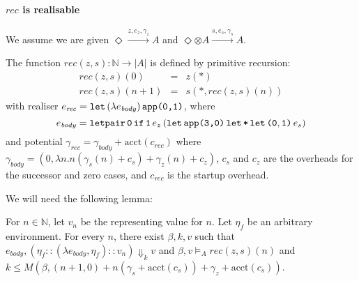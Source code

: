 \documentclass{workingnote}
\newcommand{\account}{\mathrm{acct}}
\begin{document}
\paragraph{$\mathit{rec}$ is realisable} We assume we are given
$\Diamond \stackrel{z,e_z,\gamma_z}\longrightarrow A$ and
$\Diamond \otimes A \stackrel{s,e_s,\gamma_s}\longrightarrow A$.

The function $\mathit{rec}(z,s) : \mathbb{N} \to |A|$ is defined by
primitive recursion:
\begin{displaymath}
  \begin{array}{lcl}
    \mathit{rec}(z,s)(0)&=&z(*) \\
    \mathit{rec}(z,s)(n+1)&=&s(*,\mathit{rec}(z,s)(n))
  \end{array}
\end{displaymath}
with realiser
$e_{\mathit{rec}} = \texttt{let}\,(\lambda e_{\mathit{body}})\,\texttt{app(}\texttt{0}\texttt{,}\texttt{1}\texttt{)}$, where
\begin{displaymath}
  e_{\mathit{body}} = \texttt{letpair}\,\texttt{0}\,\texttt{if}\,\texttt{1}\,e_z\,(\texttt{let}\,\texttt{app(}\texttt{3}\texttt{,}\texttt{0}\texttt{)}\,\texttt{let}\,\texttt{*}\,\texttt{let}\,\texttt{(}\texttt{0},\texttt{1}\texttt{)}\,e_s)
\end{displaymath}
and potential
$\gamma_{\mathit{rec}} = \gamma_{\mathit{body}} +
\account(c_{\mathit{rec}})$ where
$\gamma_{\mathit{body}} = (0, \lambda n. n(\gamma_s(n) + c_s)+
\gamma_z(n) + c_z)$, $c_s$ and $c_z$ are the overheads for the
successor and zero cases, and $c_{\mathit{rec}}$ is the startup
overhead.

We will need the following lemma:
\begin{lemma}\label{lem:natrec-lemma}
  For $n \in \mathbb{N}$, let $v_n$ be the representing value for
  $n$. Let $\eta_f$ be an arbitrary environment. For every $n$,
  there exist $\beta, k, v$ such that
  $e_{\mathit{body}}, (\eta_f :: (\lambda e_{\mathit{body}},\eta_f) :: v_n)
  \Downarrow_k v$ and $\beta, v \models_A \mathit{rec}(z,s)(n)$ and
  $k \leq M(\beta,(n+1,0) + n(\gamma_s + \account(c_s)) + \gamma_z +
  \account(c_s))$.
\end{lemma}
\end{document}
